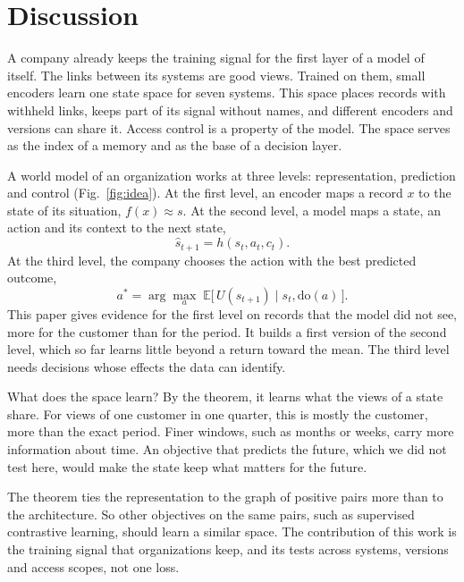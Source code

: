 \documentclass[11pt]{article}
\begin{document}
\section{Discussion}

A company already keeps the training signal for the first layer of a model of itself. The links between its systems are good views. Trained on them, small encoders learn one state space for seven systems. This space places records with withheld links, keeps part of its signal without names, and different encoders and versions can share it. Access control is a property of the model. The space serves as the index of a memory and as the base of a decision layer.

A world model of an organization works at three levels: representation, prediction and control (Fig.~\ref{fig:idea}). At the first level, an encoder maps a record $x$ to the state of its situation, $f(x) \approx s$. At the second level, a model maps a state, an action and its context to the next state,
\begin{equation}
\hat{s}_{t+1} = h(s_t, a_t, c_t).
\end{equation}
At the third level, the company chooses the action with the best predicted outcome,
\begin{equation}
a^{*} = \arg\max_{a}\; \mathbb{E}\big[\,U(s_{t+1}) \mid s_t, \mathrm{do}(a)\,\big].
\end{equation}
This paper gives evidence for the first level on records that the model did not see, more for the customer than for the period. It builds a first version of the second level, which so far learns little beyond a return toward the mean. The third level needs decisions whose effects the data can identify.

What does the space learn? By the theorem, it learns what the views of a state share\citep{balestriero2026platonic}. For views of one customer in one quarter, this is mostly the customer, more than the exact period. Finer windows, such as months or weeks, carry more information about time. An objective that predicts the future, which we did not test here, would make the state keep what matters for the future\citep{assran2025vjepa2,zhang2026hjepa}.

The theorem ties the representation to the graph of positive pairs more than to the architecture. So other objectives on the same pairs, such as supervised contrastive learning, should learn a similar space\citep{haochen2021spectral,khosla2020supcon}. The contribution of this work is the training signal that organizations keep, and its tests across systems, versions and access scopes, not one loss.
\end{document}

